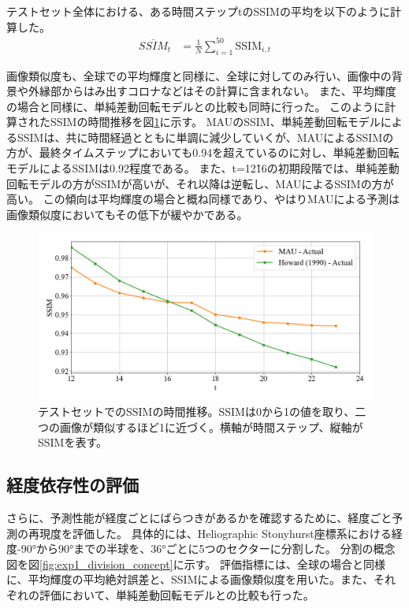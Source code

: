         テストセット全体における、ある時間ステップtのSSIMの平均を以下のように計算した。
        \begin{align}
          \bar{SSIM}_{t} & = \frac{1}{N} \sum_{i=1}^{50} \text{SSIM}_{i,t}
        \end{align}

        画像類似度も、全球での平均輝度と同様に、全球に対してのみ行い、画像中の背景や外縁部からはみ出すコロナなどはその計算に含まれない。
        また、平均輝度の場合と同様に、単純差動回転モデルとの比較も同時に行った。
        このように計算されたSSIMの時間推移を図\ref{fig:exp1_ssim_line}に示す。
        MAUのSSIM、単純差動回転モデルによるSSIMは、共に時間経過とともに単調に減少していくが、MAUによるSSIMの方が、最終タイムステップにおいても0.94を超えているのに対し、単純差動回転モデルによるSSIMは0.92程度である。
        また、t=12\~16の初期段階では、単純差動回転モデルの方がSSIMが高いが、それ以降は逆転し、MAUによるSSIMの方が高い。
        この傾向は平均輝度の場合と概ね同様であり、やはりMAUによる予測は画像類似度においてもその低下が緩やかである。 
        
        \begin{figure}[htbp]
          \centering
          \includegraphics[width=\textwidth]{figures/exp1/average_ssim.png}
          \caption{テストセットでのSSIMの時間推移。SSIMは0から1の値を取り、二つの画像が類似するほど1に近づく。横軸が時間ステップ、縦軸がSSIMを表す。}
          \label{fig:exp1_ssim_line}
        \end{figure}
      

    \subsection{経度依存性の評価}
        さらに、予測性能が経度ごとにばらつきがあるかを確認するために、経度ごと予測の再現度を評価した。
        具体的には、Heliographic Stonyhurst座標系における経度-90°から90°までの半球を、36°ごとに5つのセクターに分割した。
        分割の概念図を図\ref{fig:exp1_division_concept}に示す。
        評価指標には、全球の場合と同様に、平均輝度の平均絶対誤差と、SSIMによる画像類似度を用いた。また、それぞれの評価において、単純差動回転モデルとの比較も行った。
        
